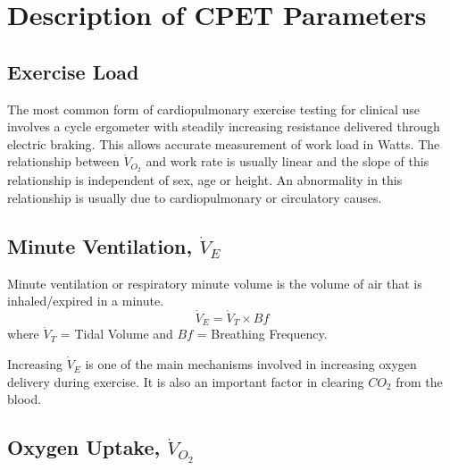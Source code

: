 \section{Description of CPET Parameters}
\label{sec:cpx_parameters}


\subsection{Exercise Load}
The most common form of cardiopulmonary exercise testing for clinical use involves a cycle ergometer with steadily increasing resistance delivered through electric braking. 
This allows accurate measurement of work load in Watts. 
The relationship between $\dot{V}_{O_2}$ and work rate is usually linear and the slope of this relationship is independent of sex, age or height. 
An abnormality in this relationship is usually due to cardiopulmonary or circulatory causes.

\subsection{Minute Ventilation, $\dot{V}_E$}
Minute ventilation or respiratory minute volume is the volume of air that is inhaled/expired in a minute.
\begin{equation} \label{eq:VE=VTxBf}
	\dot{V}_E = \dot{V}_T \times Bf
\end{equation}
where $\dot{V}_T$ = Tidal Volume and $Bf$ = Breathing Frequency.

Increasing $\dot{V}_E$ is one of the main mechanisms involved in increasing oxygen delivery during exercise. 
It is also an important factor in clearing $CO_2$ from the blood.

\subsection{Oxygen Uptake, $\dot{V}_{O_2}$}

